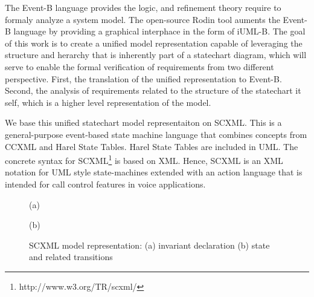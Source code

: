 \documentclass{easychair}
\begin{document}
The Event-B language provides the logic, and refinement
theory require to formaly analyze a system model. The 
open-source Rodin tool auments the Event-B language by 
providing a graphical interphace in the form of
iUML-B. The goal of this work is to create a unified model 
representation capable of leveraging the structure and 
herarchy that is inherently part of a statechart 
diagram, which will serve to enable the formal verification
of requirements from two different  perspective. First, 
the translation of the unified representation to Event-B. Second,
the analysis of requirements related to the structure of 
the statechart it self, which is a higher level representation 
of the model. 

We base this unified statechart model representaiton 
on SCXML.  This is a general-purpose event-based state machine 
language that combines concepts from CCXML and Harel 
State Tables. Harel State Tables are included in UML. 
The concrete syntax for SCXML\footnote{http://www.w3.org/TR/scxml/} 
is based on XML. Hence, SCXML is an XML notation for 
UML style state-machines extended with an action 
language that is intended for call control features 
in voice applications.


% 



\begin{figure}[tbp!]
  \begin{center}(a)\end{center}
  \begin{center}(b)\end{center}
  \caption{SCXML model representation: (a) invariant declaration (b) state and related transitions } 
  \label{fig:scxml}
\end{figure}
\end{document}
